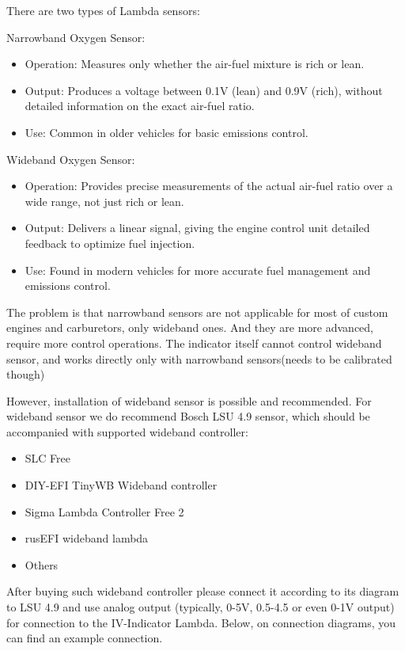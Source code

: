 There are two types of Lambda sensors:

Narrowband Oxygen Sensor:

\begin{itemize}
\item Operation: Measures only whether the air-fuel mixture is rich or lean.
\item Output: Produces a voltage between 0.1V (lean) and 0.9V (rich), without detailed information on the exact air-fuel ratio.
\item Use: Common in older vehicles for basic emissions control.
\end{itemize}
Wideband Oxygen Sensor:

\begin{itemize}
\item Operation: Provides precise measurements of the actual air-fuel ratio over a wide range, not just rich or lean.
\item Output: Delivers a linear signal, giving the engine control unit detailed feedback to optimize fuel injection.
\item Use: Found in modern vehicles for more accurate fuel management and emissions control.
\end{itemize}
The problem is that narrowband sensors are not applicable for most of custom engines and carburetors, only wideband ones. And they are more advanced, require more control operations. The indicator itself cannot control wideband sensor, and works directly only with narrowband sensors(needs to be calibrated though)

However, installation of wideband sensor is possible and recommended. For wideband sensor we do recommend Bosch LSU 4.9 sensor, which should be accompanied with supported wideband controller:

\begin{itemize}
\item SLC Free
\item DIY-EFI TinyWB Wideband controller
\item Sigma Lambda Controller Free 2
\item rusEFI wideband lambda
\item Others
\end{itemize}
After buying such wideband controller please connect it according to its diagram to LSU 4.9 and use analog output (typically, 0-5V, 0.5-4.5 or even 0-1V output) for connection to the IV-Indicator Lambda. Below, on connection diagrams, you can find an example connection.

